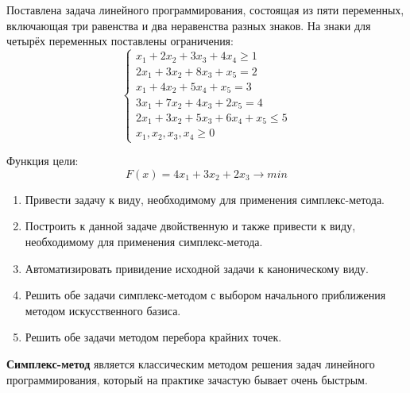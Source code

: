 \documentclass[../body.tex]{subfiles}
\begin{document}
Поставлена задача линейного программирования, состоящая из пяти переменных, включающая три равенства и два неравенства разных знаков. На знаки для четырёх переменных поставлены ограничения:
\begin{equation}\label{eq:limitation}
\left\{
\begin{array}{ll} 
	x_1+2x_2+3x_3+4x_4 \ge 1\\
	2x_1+3x_2+8x_3+x_5=2\\
	x_1+4x_2+5x_4+x_5=3\\
	3x_1+7x_2+4x_3+2x_5 = 4\\
	2x_1+3x_2+5x_3+6x_4+x_5 \le 5\\
	x_1,x_2,x_3,x_4 \ge 0
\end{array}
\right.
\end{equation}

Функция цели:
\begin{equation}\label{eq:goal}
F(x) =  4x_1 + 3x_2 + 2x_3 \longrightarrow min 
\end{equation}
\begin{enumerate}
	\item Привести задачу к виду, необходимому для применения симплекс-метода.
	\item Построить к данной задаче двойственную и также привести к виду, необходимому для применения симплекс-метода.
	\item Автоматизировать привидение исходной задачи к каноническому виду.
	\item Решить обе задачи симплекс-методом с выбором начального приближения методом искусственного базиса.
	\item Решить обе задачи методом перебора крайних точек.
\end{enumerate}
	\textbf{Симплекс-метод} является классическим методом решения задач линейного программирования, который на практике зачастую бывает очень быстрым.
\end{document}

